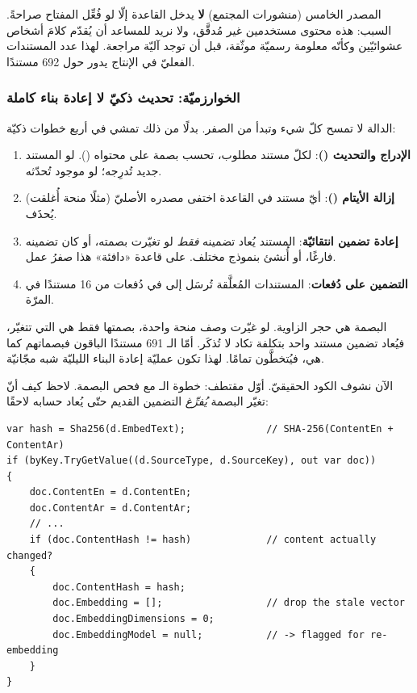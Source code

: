 \begin{note}
المصدر الخامس (منشورات المجتمع) \textbf{لا} يدخل القاعدة إلّا لو فُعِّل المفتاح
 صراحةً. السبب: هذه محتوى مستخدمين غير مُدقَّق،
ولا نريد للمساعد أن يُقدّم كلامَ أشخاص عشوائيّين وكأنّه معلومة رسميّة موثّقة، قبل أن
توجد آليّة مراجعة. لهذا عدد المستندات الفعليّ في الإنتاج يدور حول 692 مستندًا.
\end{note}

\subsubsection{الخوارزميّة: تحديث ذكيّ لا إعادة بناء كاملة}

الدالة  لا تمسح كلّ شيء وتبدأ من الصفر. بدلًا من ذلك تمشي في
أربع خطوات ذكيّة:

\begin{enumerate}
  \item \textbf{الإدراج والتحديث ()}: لكلّ مستند مطلوب، تحسب بصمة
     على محتواه (). لو المستند جديد تُدرِجه؛
    لو موجود تُحدّثه.
  \item \textbf{إزالة الأيتام ()}: أيّ مستند في القاعدة اختفى مصدره
    الأصليّ (مثلًا منحة أُغلقت) يُحذَف.
  \item \textbf{إعادة تضمين انتقائيّة}: المستند يُعاد تضمينه \emph{فقط} لو تغيّرت
    بصمته، أو كان تضمينه فارغًا، أو أُنشئ بنموذج مختلف. على قاعدة «دافئة» هذا صفرُ عمل.
  \item \textbf{التضمين على دُفعات}: المستندات المُعلَّقة تُرسَل إلى  في
    دُفعات من 16 مستندًا في المرّة.
\end{enumerate}

\begin{keyp}
البصمة  هي حجر الزاوية. لو غيّرت وصف منحة واحدة، بصمتها فقط هي التي
تتغيّر، فيُعاد تضمين مستند واحد بتكلفة تكاد لا تُذكَر. أمّا الـ 691 مستندًا الباقون
فبصماتهم كما هي، فيُتخطَّون تمامًا. لهذا تكون عمليّة إعادة البناء الليليّة شبه مجّانيّة.
\end{keyp}

الآن نشوف الكود الحقيقيّ. أوّل مقتطف: خطوة الـ  مع فحص البصمة. لاحظ كيف
أنّ تغيّر البصمة \emph{يُفرِّغ} التضمين القديم حتّى يُعاد حسابه لاحقًا:

\begin{english}
\begin{lstlisting}[language={[Sharp]C}]
var hash = Sha256(d.EmbedText);              // SHA-256(ContentEn + ContentAr)
if (byKey.TryGetValue((d.SourceType, d.SourceKey), out var doc))
{
    doc.ContentEn = d.ContentEn;
    doc.ContentAr = d.ContentAr;
    // ...
    if (doc.ContentHash != hash)             // content actually changed?
    {
        doc.ContentHash = hash;
        doc.Embedding = [];                  // drop the stale vector
        doc.EmbeddingDimensions = 0;
        doc.EmbeddingModel = null;           // -> flagged for re-embedding
    }
}
\end{lstlisting}
\end{english}

